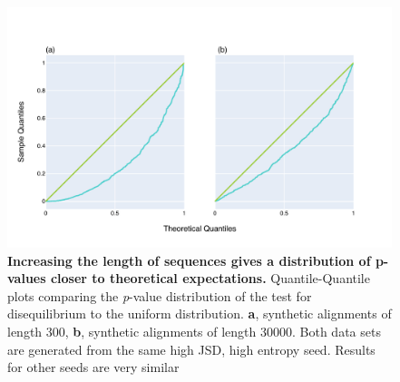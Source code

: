 \begin{figure}[!ht]
\centering
\includegraphics[width=\textwidth]{figures/plots/synthetic/lrt/197113_332182_17210-long_seq.pdf}
\caption{\textbf{Increasing the length of sequences gives a distribution of p-values closer to theoretical expectations.} Quantile-Quantile plots comparing the \textit{p}-value distribution of the test for disequilibrium to the uniform distribution. \textbf{a}, synthetic alignments of length 300, \textbf{b}, synthetic alignments of length 30000. Both data sets are generated from the same high JSD, high entropy seed. Results for other seeds are very similar}
\label{fig:synthetic/lrt/197113-long_seq}
\end{figure}